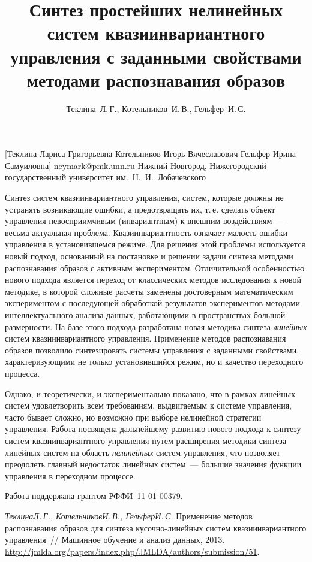 \documentclass[twoside]{article}
\begin{document}
\title
    {Синтез простейших нелинейных систем квазиинвариантного управления с заданными свойствами методами распознавания образов}
\author
    {Теклина~Л.\,Г., Котельников~И.\,В., Гельфер~И.\,С.} %
    [Теклина Лариса Григорьевна \coauthor Котельников Игорь Вячеславович \coauthor Гельфер Ирина Самуиловна] %
\email
    {neymark@pmk.unn.ru}
\organization
    {Нижний Новгород, Нижегородский государственный университет им.~Н.~И.~Лобачевского}
\maketitle

Синтез систем  квазиинвариантного управления, систем, которые должны не устранять возникающие ошибки, а предотвращать их, т.\,е. сделать объект управления невосприимчивым (инвариантным) к внешним воздействиям~--- весьма актуальная проблема. Квазиинвариантность означает малость ошибки управления в установившемся режиме. Для решения этой проблемы используется новый подход, основанный на постановке и решении задачи синтеза методами распознавания образов с активным экспериментом. Отличительной особенностью нового подхода является переход от классических методов исследования к новой методике, в которой сложные расчеты заменены достоверным математическим экспериментом с последующей обработкой результатов экспериментов методами интеллектуального анализа данных, работающими в пространствах большой размерности. На базе этого подхода разработана новая методика синтеза \emph {линейных} систем квазиинвариантного управления. Применение методов распознавания образов позволило синтезировать системы управления с заданными свойствами, характеризующими не только установившийся режим, но и качество переходного процесса.

Однако, и теоретически, и экспериментально показано, что в рамках линейных систем удовлетворить всем требованиям, выдвигаемым к системе управления, часто бывает сложно, но возможно при выборе нелинейной стратегии управления. Работа посвящена дальнейшему развитию нового подхода к синтезу систем квазиинвариантного управления путем расширения методики синтеза линейных систем на область \emph {нелинейных} систем управления, что позволяет преодолеть главный недостаток линейных систем~--- большие значения функции управления в переходном процессе.

Работа поддержана грантом РФФИ \No\,11-01-00379.

\begin{thebibliography}{1}
    \emph{Теклина\;Л.\,Г., Котельников\;И.\,В., Гельфер\;И.\,С.}
    Применение методов распознавания образов для синтеза кусочно-линейных систем квазиинвариантного управления~//
    Машинное обучение и анализ данных,
    2013.
    \url{http://jmlda.org/papers/index.php/JMLDA/authors/submission/51}.
\end{thebibliography}
\end{document}
